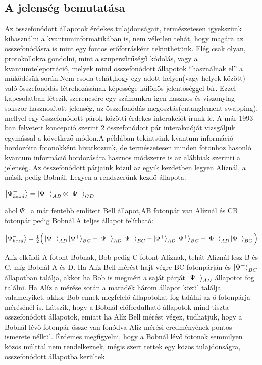 \subsection{A jelenség bemutatása}
Az összefonódott állapotok érdekes tulajdonságait, természetesen igyekszünk kihasználni a kvantuminformatikában is, nem véletlen tehát, hogy magára az összefonódásra is mint egy fontos erőforrásként tekinthetünk. Elég csak olyan, protokollokra gondolni, mint a szupersűrűségű kódolás, vagy a kvantumteleportáció, melyek mind összefonódott állapotok “használnak el” a működésük során.Nem csoda tehát,hogy egy adott helyen(vagy helyek között) való összefonódás létrehozásának képessége különös jelentőséggel bír. Ezzel kapcsolatban létezik szerencsére egy számunkra igen hasznos és viszonylag sokszor hasznosított jelenség, az összefonódás megosztás(entanglement swapping), mellyel egy összefonódott párok közötti érdekes interakciót írunk le. A már 1993-ban felvetett koncepció szerint\cite{zukowski1993event} 2 összefonódott pár interakcióját vizsgáljuk egymással a következő módon.A példában tekintsünk kvantum információ hordozóira fotonokként hivatkozunk, de természetesen minden fotonhoz hasonló kvantum információ hordozására hasznos módszerre is az alábbiak szerinti a jelenség. Az összefonódott párjaink közül az egyik kezdetben legyen Alíznál, a másik pedig Bobnál. Legyen a rendszerünk kezdő állapota:
\begin{center}
$ \ket{\Psi_{kezd}^-}= \ket{\Psi^-}_{AB} \otimes \ket{\Psi^-}_{CD} $
\end{center}
ahol $ \Psi^- $ a már fentebb említett Bell állapot,AB fotonpár van Alíznál és CB fotonpár pedig Bobnál.A teljes állapot felírható:
\begin{center}
$ \ket{\Psi_{kezd}^-} = \frac{1}{2} \Big( \ket{\Psi^+}_{AD}\ket{\Psi^+}_{BC}-\ket{\Psi^-}_{AD}\ket{\Psi^-}_{BC} - \ket{\Phi^+}_{AD}\ket{\Phi^+}_{BC}+\ket{\Phi^-}_{AD}\ket{\Phi^-}_{BC} \Big) $
\end{center}
Alíz elküldi A fotont Bobnak, Bob pedig C fotont Alíznak, tehát Alíznál lesz B és C, míg Bobnál A és D. Ha Alíz Bell mérést hajt végre BC fotonpárján és $ \ket{\Psi^-}_{BC} $  állapotban találja, akkor ha Bob is megméri a saját párját $ \ket{\Psi^-}_{AD} $ állapotot fog találni. Ha Alíz a mérése során a maradék három állapot közül találja valamelyiket, akkor Bob ennek megfelelő állapotokat fog találni az ő fotonpárja mérésénél is. Látszik, hogy a Bobnál előfordulható állapotok mind tiszta összefonódott állapotok, emiatt ha Alíz Bell mérést végez, tudhatjuk, hogy a Bobnál lévő fotonpár össze van fonódva Alíz mérési eredményének pontos ismerete nélkül. Érdemes megfigyelni, hogy a Bobnál lévő fotonok semmilyen közös múlttal nem rendelkeznek, mégis szert tettek egy közös tulajdonságra, összefonódott állapotba kerültek.
